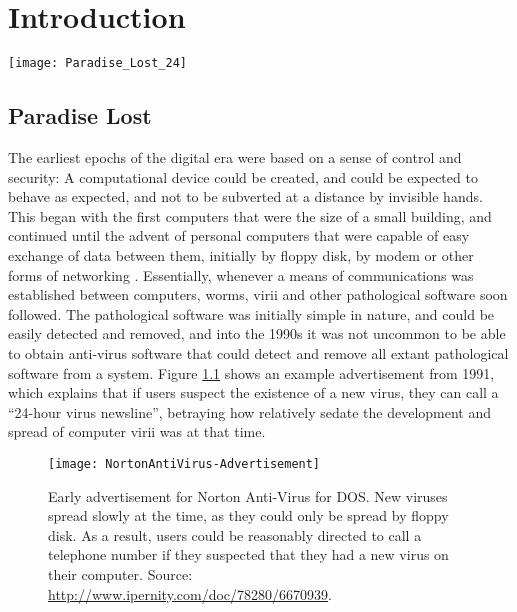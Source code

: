 
\chapter{Introduction} %

\label{Chapter 1} %

\texttt{[image: Paradise\_Lost\_24]}

\section{Paradise Lost}

\label{Ch1 Sec1}

The earliest epochs of the digital era were based on a sense of control and security:  A computational device could be
created, and could be expected to behave as expected, and not to be subverted at a distance by invisible hands.
This began with the first computers that were the size of a small building, and continued until the advent of personal
computers that were capable of easy exchange of data between them, initially by floppy disk, by modem or
other forms of networking \cite{chen2004evolution}. 
Essentially, whenever a means of communications was established between computers, worms, virii and other
pathological software soon followed.   The pathological software was initially simple in nature, and
could be easily detected and removed, and into the 1990s it was not uncommon to be able to obtain anti-virus
software that could detect and remove all extant pathological software from a system.
Figure \ref{fig:nortonad} shows an example advertisement from 1991, which explains that if users suspect
the existence of a new virus, they can call a ``24-hour virus newsline'', betraying how relatively
sedate the development and spread of computer virii was at that time.

\begin{figure}
  \centering
  \texttt{[image: NortonAntiVirus-Advertisement]}
  \caption{Early advertisement for Norton Anti-Virus for DOS. New viruses spread slowly at the time, as they could
    only be spread by floppy disk. As a result, users could be reasonably directed to call a telephone number if they
    suspected that they had a new virus on their computer. Source: \url{http://www.ipernity.com/doc/78280/6670939}.
  }
  \label{fig:nortonad}
\end{figure}

